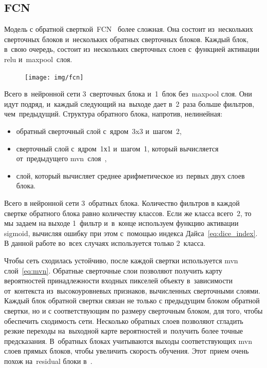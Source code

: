 \subsection{FCN}

Модель с обратной сверткой~FCN~\cite{fcn} более сложная. Она состоит из~нескольких сверточных блоков и~нескольких обратных сверточных блоков. Каждый блок, в~свою очередь, состоит из~нескольких сверточных слоев с~функцией активации relu и~maxpool~слоя. 

\begin{figure}[ht]
  \texttt{[image: img/fcn]}
\end{figure}

Всего в~нейронной сети 3~сверточных блока и~1~блок без~maxpool слоя. Они идут подряд, и~каждый следующий на~выходе дает в~2~раза больше фильтров, чем~предыдущий. 
\newpage
Структура обратного блока, напротив, нелинейная:

\begin{itemize}
  \item обратный сверточный слой с~ядром~3x3 и~шагом~2,
  \item сверточный слой с~ядром~1х1 и~шагом~1, который вычисляется от~предыдущего mvn~слоя~\cite{batch_norm},
  \item слой, который вычисляет среднее арифметическое из~первых двух слоев блока.
\end{itemize}

Всего в нейронной сети 3~обратных блока. 
Количество фильтров в каждой свертке обратного блока 
равно количеству классов. Если же класса всего~2, 
то мы задаем на выходе 1~фильтр и~в~конце используем 
функцию активации sigmoid, вычисляя ошибку при этом 
с~помощью индекса Дайса~\eqref{eq:dice_index}. 
В данной работе во~всех случаях используется только 2~класса.

Чтобы сеть сходилась устойчиво, после каждой свертки 
используется mvn слой~\eqref{eq:mvn}. Обратные сверточные слои 
позволяют получить карту вероятностей принадлежности 
входных пикселей объекту в~зависимости от~контекста 
из~высокоуровневых признаков, вычисленных сверточными слоями. 
Каждый блок обратной свертки связан не только с предыдущим блоком 
обратной свертки, но и с соответствующим по размеру сверточным блоком, 
для того, чтобы обеспечить сходимость сети. Несколько обратных слоев 
позволяют сгладить резкие переходы на~выходной карте вероятностей 
и~получить более точные предсказания. В~обратных блоках учитываются 
выходы соответствующих mvn слоев прямых блоков, чтобы увеличить 
скорость обучения. Этот~прием очень похож на~residual блоки в~\cite{resnet}.

